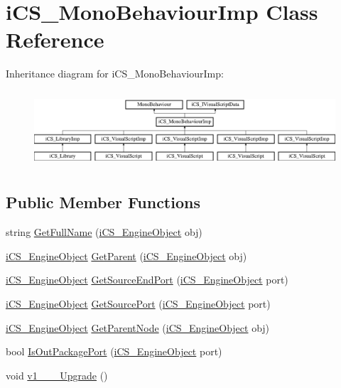 \hypertarget{classi_c_s___mono_behaviour_imp}{\section{i\+C\+S\+\_\+\+Mono\+Behaviour\+Imp Class Reference}
\label{classi_c_s___mono_behaviour_imp}
}
Inheritance diagram for i\+C\+S\+\_\+\+Mono\+Behaviour\+Imp\+:\begin{figure}[H]
\begin{center}
\leavevmode
\includegraphics[height=2.871795cm]{classi_c_s___mono_behaviour_imp}
\end{center}
\end{figure}
\subsection*{Public Member Functions}
\begin{DoxyCompactItemize}
\item 
string \hyperlink{classi_c_s___mono_behaviour_imp_a1d301e319ec1df9f4a2e5867cf7a3c84}{Get\+Full\+Name} (\hyperlink{classi_c_s___engine_object}{i\+C\+S\+\_\+\+Engine\+Object} obj)
\item 
\hyperlink{classi_c_s___engine_object}{i\+C\+S\+\_\+\+Engine\+Object} \hyperlink{classi_c_s___mono_behaviour_imp_a8ec1af90994f9a803d282909bf25a802}{Get\+Parent} (\hyperlink{classi_c_s___engine_object}{i\+C\+S\+\_\+\+Engine\+Object} obj)
\item 
\hyperlink{classi_c_s___engine_object}{i\+C\+S\+\_\+\+Engine\+Object} \hyperlink{classi_c_s___mono_behaviour_imp_acceac535ac269f419634cd5aa97537cd}{Get\+Source\+End\+Port} (\hyperlink{classi_c_s___engine_object}{i\+C\+S\+\_\+\+Engine\+Object} port)
\item 
\hyperlink{classi_c_s___engine_object}{i\+C\+S\+\_\+\+Engine\+Object} \hyperlink{classi_c_s___mono_behaviour_imp_aad71e9806b9961b586f75b87b8faf2f7}{Get\+Source\+Port} (\hyperlink{classi_c_s___engine_object}{i\+C\+S\+\_\+\+Engine\+Object} port)
\item 
\hyperlink{classi_c_s___engine_object}{i\+C\+S\+\_\+\+Engine\+Object} \hyperlink{classi_c_s___mono_behaviour_imp_acf7d14407f34739a6efdc172cd307073}{Get\+Parent\+Node} (\hyperlink{classi_c_s___engine_object}{i\+C\+S\+\_\+\+Engine\+Object} obj)
\item 
bool \hyperlink{classi_c_s___mono_behaviour_imp_ada2a97448d220a8ef39e2e501b0bf468}{Is\+Out\+Package\+Port} (\hyperlink{classi_c_s___engine_object}{i\+C\+S\+\_\+\+Engine\+Object} port)
\item 
void \hyperlink{classi_c_s___mono_behaviour_imp_a67a5aa9ce0d9d6cd099ac19d18d1bdf5}{v1\+\_\+\_\+\_\+\+Upgrade} ()
\end{DoxyCompactItemize}
